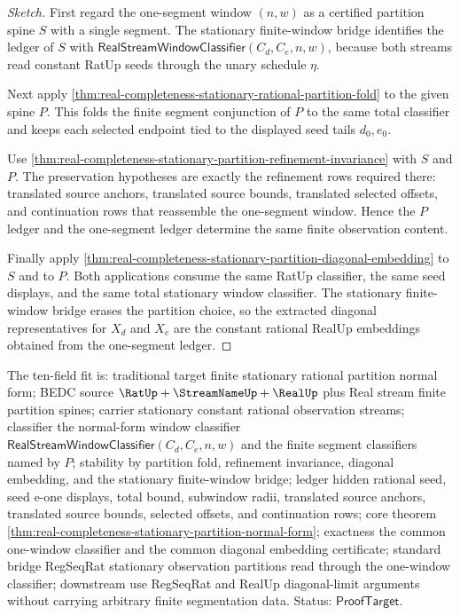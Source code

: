 \begin{proof}[Sketch]
First regard the one-segment window $(n,w)$ as a certified partition spine
$S$ with a single segment. The stationary finite-window bridge identifies the
ledger of $S$ with
$\mathsf{RealStreamWindowClassifier}(C_d,C_e,n,w)$, because both streams read
constant RatUp seeds through the unary schedule $\eta$.

Next apply
\autoref{thm:real-completeness-stationary-rational-partition-fold} to the
given spine $P$. This folds the finite segment conjunction of $P$ to the same
total classifier and keeps each selected endpoint tied to the displayed seed
tails $d_0,e_0$.

Use
\autoref{thm:real-completeness-stationary-partition-refinement-invariance}
with $S$ and $P$. The preservation hypotheses are exactly the refinement rows
required there: translated source anchors, translated source bounds,
translated selected offsets, and continuation rows that reassemble the
one-segment window. Hence the $P$ ledger and the one-segment ledger determine
the same finite observation content.

Finally apply
\autoref{thm:real-completeness-stationary-partition-diagonal-embedding} to
$S$ and to $P$. Both applications consume the same RatUp classifier, the same
seed displays, and the same total stationary window classifier. The stationary
finite-window bridge erases the partition choice, so the extracted diagonal
representatives for $X_d$ and $X_e$ are the constant rational RealUp
embeddings obtained from the one-segment ledger.
\end{proof}

The ten-field fit is: traditional target finite stationary rational
partition normal form; BEDC source $\RatUp+\StreamNameUp+\RealUp$ plus Real
stream finite partition spines; carrier stationary constant rational
observation streams; classifier the normal-form window classifier
$\mathsf{RealStreamWindowClassifier}(C_d,C_e,n,w)$ and the finite segment
classifiers named by $P$; stability by partition fold, refinement invariance,
diagonal embedding, and the stationary finite-window bridge; ledger hidden
rational seed, seed e-one displays, total bound, subwindow radii, translated
source anchors, translated source bounds, selected offsets, and continuation
rows; core theorem
\autoref{thm:real-completeness-stationary-partition-normal-form}; exactness
the common one-window classifier and the common diagonal embedding
certificate; standard bridge RegSeqRat stationary observation partitions read
through the one-window classifier; downstream use RegSeqRat and RealUp
diagonal-limit arguments without carrying arbitrary finite segmentation data.
Status: $\mathsf{ProofTarget}$.

